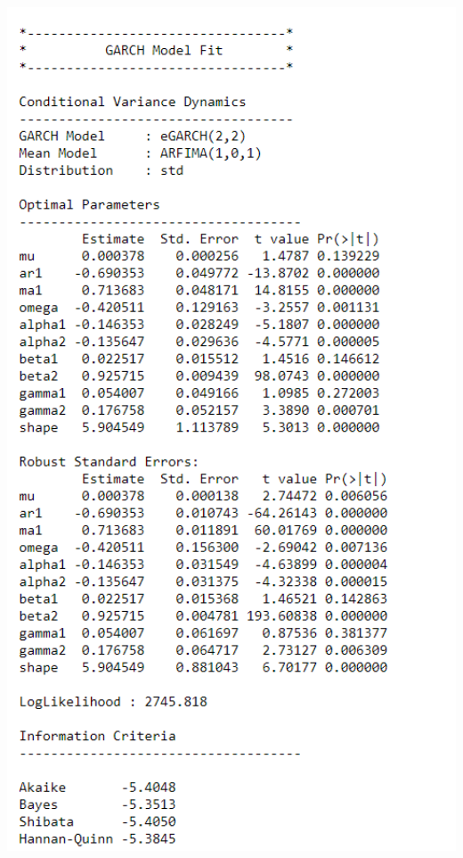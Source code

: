 \documentclass[
  12pt,
  a4paper,
  openany]{book}
\begin{document}
\begin{center}
\begin{minipage}{0.90\linewidth}
    \centering
    \includegraphics[width=2\textwidth]{image/air1.png}
\end{minipage}
\end{center}

\newpage
\end{document}

